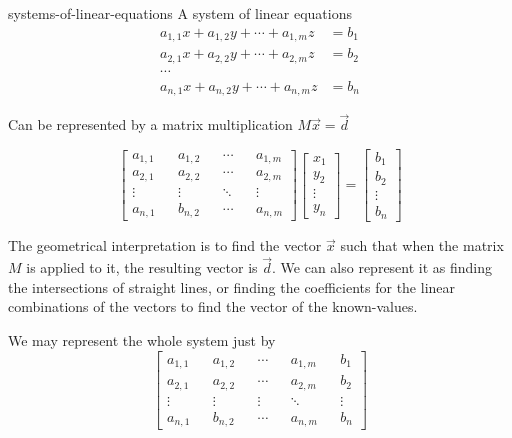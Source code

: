 \documentclass[preview]{standalone}
\begin{document}
\begin{snippet}{systems-of-linear-equations}
    A system of linear equations
    \begin{align*}
        a_{1, 1}x + a_{1, 2}y + \cdots + a_{1, m}z &= b_1 \\
        a_{2, 1}x + a_{2, 2}y + \cdots + a_{2, m}z &= b_2 \\
        \cdots \\
        a_{n, 1}x + a_{n, 2}y + \cdots + a_{n, m}z &= b_n
    \end{align*}

    Can be represented by a matrix multiplication \(M\vec{x}=\vec{d}\)

    \[
        \begin{bmatrix} 
            a_{1, 1} && a_{1, 2} && \cdots && a_{1, m} \\
            a_{2, 1} && a_{2, 2} && \cdots && a_{2, m} \\
            \vdots && \vdots && \ddots && \vdots \\
            a_{n, 1} && b_{n, 2} && \cdots && a_{n, m}
        \end{bmatrix}
        \begin{bmatrix}
            x_1 \\ y_2 \\ \vdots \\ y_n
        \end{bmatrix}
        =
        \begin{bmatrix}
            b_1 \\ b_2 \\ \vdots \\ b_n
        \end{bmatrix}
    \]

    The geometrical interpretation is to find the vector \(\vec{x}\)
    such that when the matrix \(M\) is applied to it, the resulting vector is \(\vec{d}\).
    We can also represent it as finding the intersections of straight lines, or finding the coefficients
    for the linear combinations of the vectors to find the vector of the known-values.

    We may represent the whole system just by
    \[
        \begin{bmatrix} 
            a_{1, 1} && a_{1, 2} && \cdots && a_{1, m} && b_1 \\
            a_{2, 1} && a_{2, 2} && \cdots && a_{2, m} && b_2 \\
            \vdots && \vdots && \vdots && \ddots && \vdots \\
            a_{n, 1} && b_{n, 2} && \cdots && a_{n, m} && b_n
        \end{bmatrix}
    \]
\end{snippet}
\end{document}
